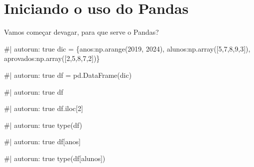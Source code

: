 \documentclass[
  letterpaper,
  DIV=11,
  numbers=noendperiod]{scrreprt}
\newenvironment{Shaded}{\begin{snugshade}}{\end{snugshade}}
\newcommand{\NormalTok}[1]{\textcolor[rgb]{0.00,0.23,0.31}{#1}}
\begin{document}
\section{Iniciando o uso do Pandas}\label{iniciando-o-uso-do-pandas}

Vamos começar devagar, para que serve o Pandas?

\begin{Shaded}
\begin{Highlighting}[]
\NormalTok{\#| autorun: true}
\NormalTok{dic = \{\textquotesingle{}anos\textquotesingle{}:np.arange(2019, 2024), }
\NormalTok{       \textquotesingle{}alunos\textquotesingle{}:np.array([5,7,8,9,3]),}
\NormalTok{       \textquotesingle{}aprovados\textquotesingle{}:np.array([2,5,8,7,2])\}}
\end{Highlighting}
\end{Shaded}

\begin{Shaded}
\begin{Highlighting}[]
\NormalTok{\#| autorun: true}
\NormalTok{df = pd.DataFrame(dic)}
\end{Highlighting}
\end{Shaded}

\begin{Shaded}
\begin{Highlighting}[]
\NormalTok{\#| autorun: true}
\NormalTok{df}
\end{Highlighting}
\end{Shaded}

\begin{Shaded}
\begin{Highlighting}[]
\NormalTok{\#| autorun: true}
\NormalTok{df.iloc[2]}
\end{Highlighting}
\end{Shaded}

\begin{Shaded}
\begin{Highlighting}[]
\NormalTok{\#| autorun: true}
\NormalTok{type(df)}
\end{Highlighting}
\end{Shaded}

\begin{Shaded}
\begin{Highlighting}[]
\NormalTok{\#| autorun: true}
\NormalTok{df[\textquotesingle{}anos\textquotesingle{}]}
\end{Highlighting}
\end{Shaded}

\begin{Shaded}
\begin{Highlighting}[]
\NormalTok{\#| autorun: true}
\NormalTok{type(df[\textquotesingle{}alunos\textquotesingle{}])}
\end{Highlighting}
\end{Shaded}
\end{document}
